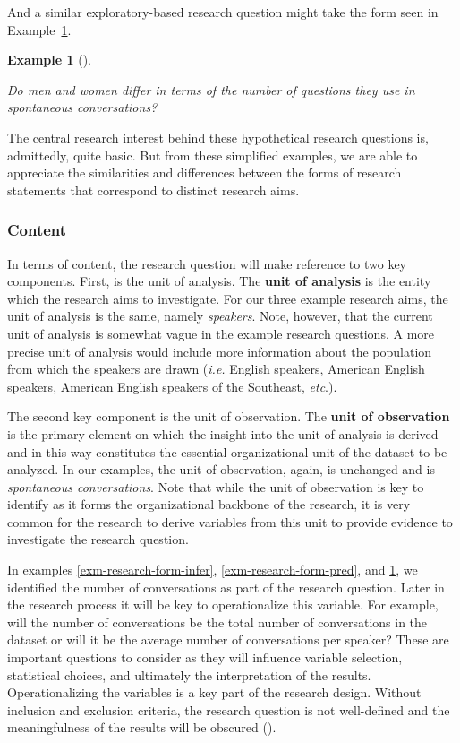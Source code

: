 \documentclass[
  letterpaper,
]{latex/krantz}
\theoremstyle{definition}
\newtheorem{example}{Example}[chapter]
\theoremstyle{remark}
\begin{document}
And a similar exploratory-based research question might take the form
seen in Example~\ref{exm-research-form-exp}.

\begin{example}[]\protect\hypertarget{exm-research-form-exp}{}\label{exm-research-form-exp}

\emph{Do men and women differ in terms of the number of questions they
use in spontaneous conversations?}

\end{example}

The central research interest behind these hypothetical research
questions is, admittedly, quite basic. But from these simplified
examples, we are able to appreciate the similarities and differences
between the forms of research statements that correspond to distinct
research aims.

\subsubsection{Content}\label{sec-research-question-content}

In terms of content, the research question will make reference to two
key components. First, is the unit of analysis. The \textbf{unit of
analysis} is the entity which the research aims to investigate. For our
three example research aims, the unit of analysis is the same, namely
\emph{speakers}. Note, however, that the current unit of analysis is
somewhat vague in the example research questions. A more precise unit of
analysis would include more information about the population from which
the speakers are drawn (\emph{i.e.} English speakers, American English
speakers, American English speakers of the Southeast, \emph{etc}.).

The second key component is the unit of observation. The \textbf{unit of
observation} is the primary element on which the insight into the unit
of analysis is derived and in this way constitutes the essential
organizational unit of the dataset to be analyzed. In our examples, the
unit of observation, again, is unchanged and is \emph{spontaneous
conversations}. Note that while the unit of observation is key to
identify as it forms the organizational backbone of the research, it is
very common for the research to derive variables from this unit to
provide evidence to investigate the research question.

In examples \ref{exm-research-form-infer}, \ref{exm-research-form-pred},
and \ref{exm-research-form-exp}, we identified the number of
conversations as part of the research question. Later in the research
process it will be key to operationalize this variable. For example,
will the number of conversations be the total number of conversations in
the dataset or will it be the average number of conversations per
speaker? These are important questions to consider as they will
influence variable selection, statistical choices, and ultimately the
interpretation of the results. Operationalizing the variables is a key
part of the research design. Without inclusion and exclusion criteria,
the research question is not well-defined and the meaningfulness of the
results will be obscured ().
\end{document}
